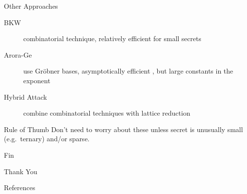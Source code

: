 \documentclass[table,10pt,aspectratio=169]{beamer}
\begin{document}
\begin{frame}[label={sec:org6cee553}]{Other Approaches}
\begin{description}
\item[{BKW}] combinatorial technique, relatively efficient for small secrets
\item[{Arora-Ge}] use Gröbner bases, asymptotically efficient , but large constants in the exponent
\item[{Hybrid Attack}] combine combinatorial techniques with lattice reduction
\end{description}

\begin{alertblock}{Rule of Thumb}
Don’t need to worry about these unless secret is unusually small (e.g. ternary) and/or sparse.
\end{alertblock}
\end{frame}

\begin{frame}[label={sec:org8154661},standout]{Fin}
\begin{center}
\Huge \alert{Thank You}
\end{center}
\end{frame}

\begin{frame}[allowframebreaks]{References}
\renewcommand*{\bibfont}{\scriptsize}
\printbibliography[heading=none]
\end{frame}
\end{document}
